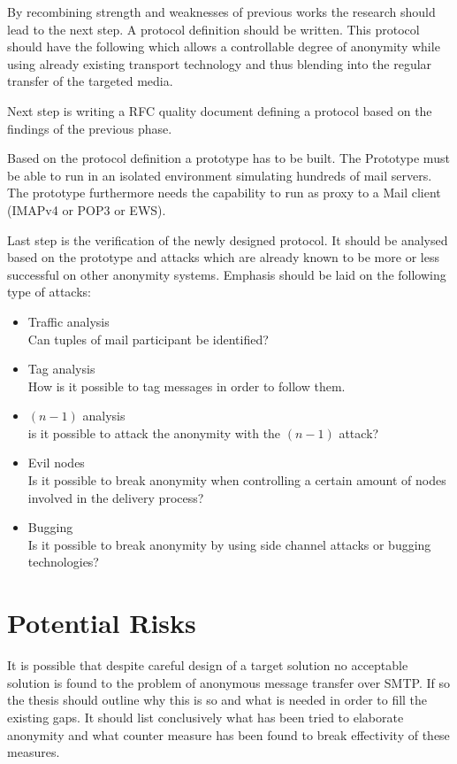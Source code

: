 \documentclass[twocolumn,a4paper]{article}
\newenvironment{myitemize}{\begin{itemize}\setlength{\itemsep}{0em}}{\end{itemize}}
\begin{document}
By recombining strength and weaknesses of previous works the research should lead to the next step. A protocol definition should be written. This protocol should have the following which allows a controllable degree of anonymity while using already existing transport technology and thus blending into the regular transfer of the targeted media. \par

Next step is writing a RFC quality document defining a protocol based on the findings of the previous phase. \par

Based on the protocol definition a prototype has to be built. The Prototype must be able to run in an isolated environment simulating hundreds of mail servers. The prototype furthermore needs the capability to run as proxy to a Mail client (IMAPv4 or POP3 or EWS).\par

Last step is the verification of the newly designed protocol. It should be analysed based on the prototype and attacks which are already known to be more or less successful on other anonymity systems. Emphasis should be laid on the following type of attacks:\par
\begin{myitemize}
\item Traffic analysis\\Can tuples of mail participant be identified?  
\item Tag analysis\\How is it possible to tag messages in order to follow them.
\item $(n-1)$ analysis\\is it possible to attack the anonymity with the $(n-1)$ attack?
\item Evil nodes\\ Is it possible to break anonymity when controlling a certain amount of nodes involved in the delivery process?
\item Bugging\\Is it possible to break anonymity by using side channel attacks or bugging technologies?
\end{myitemize}

\section{Potential Risks}
It is possible that despite careful design of a target solution no acceptable solution is found to the problem of anonymous message transfer over SMTP. If so the thesis should outline why this is so and what is needed in order to fill the existing gaps. It should list conclusively what has been tried to elaborate anonymity and what counter measure has been found to break effectivity of these measures.\par
\end{document}
